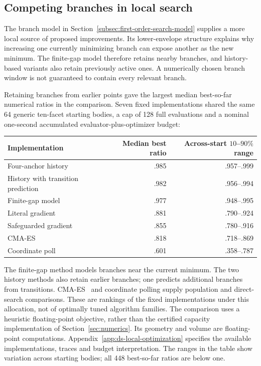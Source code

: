 \subsection{Competing branches in local search}
\label{subsec:black-box-datascience-finite-budget-optimization}

The branch model in Section~\ref{subsec:first-order-search-model}
supplies a more local source of proposed improvements. Its lower-envelope
structure explains why increasing one currently minimizing branch can
expose another as the new minimum. The
finite-gap model therefore retains nearby branches, and history-based
variants also retain previously active ones. A numerically chosen branch
window is not guaranteed to contain every relevant branch.

Retaining branches from earlier points gave the largest median
best-so-far numerical ratios in the comparison. Seven fixed
implementations shared the same 64 generic ten-facet starting bodies, a cap
of 128 full evaluations and a nominal one-second accumulated
evaluator-plus-optimizer budget:
\begin{center}
\begin{tabular}{lrr}
\hline
Implementation & Median best ratio & Across-start $10$--$90\%$ range\\
\hline
Four-anchor history & .985 & .957--.999\\
History with transition prediction & .982 & .956--.994\\
Finite-gap model & .977 & .948--.995\\
Literal gradient & .881 & .790--.924\\
Safeguarded gradient & .855 & .780--.916\\
CMA-ES & .818 & .718--.869\\
Coordinate poll & .601 & .358--.787\\
\hline
\end{tabular}
\end{center}
The finite-gap method models branches near the current minimum. The two
history methods also retain earlier branches; one predicts additional
branches from transitions. CMA-ES~\cite{dsHansen2016} and coordinate polling
supply population and direct-search comparisons. These are rankings of
the fixed implementations under this allocation, not of optimally tuned
algorithm families. The comparison uses a heuristic floating-point objective,
rather than the certified capacity implementation of Section~\ref{sec:numerics}.
Its geometry and volume are floating-point computations. Appendix~\ref{app:ds-local-optimization} specifies the
available implementations, traces and budget interpretation. The ranges in the table
show variation across starting bodies; all 448 best-so-far ratios are below one.

